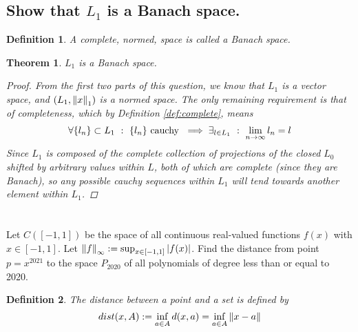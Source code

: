\documentclass[]{article}
\newcommand{\st}{\ : \ }
\newtheorem{definition}{Definition}
\newtheorem{theorem}{Theorem}
\begin{document}
\subsection{Show that $L_1$ is a Banach space.}
\begin{definition}
    A complete, normed, space is called a \emph{Banach space}.
\end{definition}

\begin{theorem}
    $L_1$ is a Banach space.
    \begin{proof}
        From the first two parts of this question, we know that $L_1$ is a vector space, and $(L_1, \norm{x}_1)$ is a normed space.
        The only remaining requirement is that of completeness, which by Definition \ref{def:complete}, means
        \begin{align*}
            \forall\{l_n\} \subset L_1 \st \{l_n\} \ \textnormal{cauchy} \ \implies \exists_{l \in L_1} \st \lim_{n\to\infty} l_n = l
        \end{align*}
        Since $L_1$ is composed of the complete collection of projections of the closed $L_0$ shifted by arbitrary values within $L$, both of which are complete (since they are Banach), so any possible cauchy sequences within $L_1$ will tend towards another element within $L_1$.
    \end{proof}
\end{theorem}




\newpage
\section{}
Let $C([-1,1])$ be the space of all continuous real-valued functions $f(x)$ with $x \in [-1,1]$. 
Let $\norm{f}_\infty := \sup_{x \in [-1,1]} \abs{f(x)}$. 
Find the distance from point $p = x^{2021}$ to the space $P_{2020}$ of all polynomials of degree less than or equal to 2020.

\begin{definition}
    The \emph{distance} between a point and a set is defined by 
    \[dist(x,A) := \inf_{a \in A} d(x,a) = \inf_{a \in A} \norm{x - a}\]
\end{definition}
\end{document}
